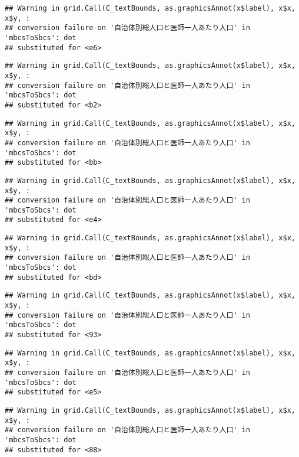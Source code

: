 \documentclass[
]{article}
\begin{document}
\begin{verbatim}
## Warning in grid.Call(C_textBounds, as.graphicsAnnot(x$label), x$x, x$y, :
## conversion failure on '自治体別総人口と医師一人あたり人口' in 'mbcsToSbcs': dot
## substituted for <e6>
\end{verbatim}

\begin{verbatim}
## Warning in grid.Call(C_textBounds, as.graphicsAnnot(x$label), x$x, x$y, :
## conversion failure on '自治体別総人口と医師一人あたり人口' in 'mbcsToSbcs': dot
## substituted for <b2>
\end{verbatim}

\begin{verbatim}
## Warning in grid.Call(C_textBounds, as.graphicsAnnot(x$label), x$x, x$y, :
## conversion failure on '自治体別総人口と医師一人あたり人口' in 'mbcsToSbcs': dot
## substituted for <bb>
\end{verbatim}

\begin{verbatim}
## Warning in grid.Call(C_textBounds, as.graphicsAnnot(x$label), x$x, x$y, :
## conversion failure on '自治体別総人口と医師一人あたり人口' in 'mbcsToSbcs': dot
## substituted for <e4>
\end{verbatim}

\begin{verbatim}
## Warning in grid.Call(C_textBounds, as.graphicsAnnot(x$label), x$x, x$y, :
## conversion failure on '自治体別総人口と医師一人あたり人口' in 'mbcsToSbcs': dot
## substituted for <bd>
\end{verbatim}

\begin{verbatim}
## Warning in grid.Call(C_textBounds, as.graphicsAnnot(x$label), x$x, x$y, :
## conversion failure on '自治体別総人口と医師一人あたり人口' in 'mbcsToSbcs': dot
## substituted for <93>
\end{verbatim}

\begin{verbatim}
## Warning in grid.Call(C_textBounds, as.graphicsAnnot(x$label), x$x, x$y, :
## conversion failure on '自治体別総人口と医師一人あたり人口' in 'mbcsToSbcs': dot
## substituted for <e5>
\end{verbatim}

\begin{verbatim}
## Warning in grid.Call(C_textBounds, as.graphicsAnnot(x$label), x$x, x$y, :
## conversion failure on '自治体別総人口と医師一人あたり人口' in 'mbcsToSbcs': dot
## substituted for <88>
\end{verbatim}
\end{document}
